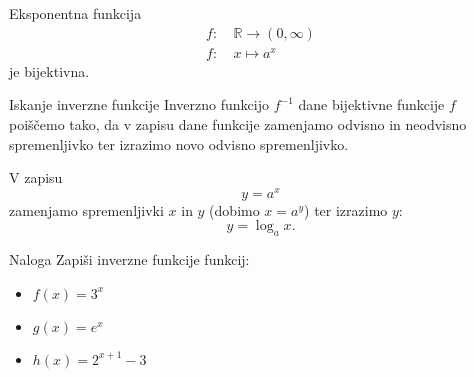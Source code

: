         \begin{frame}[t]

            Eksponentna funkcija
            \begin{align*}
                f:\ &\mathbb{R} \to (0,\infty)\\
                f:\  &x \mapsto a^x
            \end{align*}
            je bijektivna. 
            
            \begin{block}{Iskanje inverzne funkcije}
                Inverzno funkcijo $f^{-1}$ dane bijektivne funkcije $f$ poiščemo tako, da v zapisu dane funkcije zamenjamo odvisno in neodvisno spremenljivko ter izrazimo novo odvisno spremenljivko.
            \end{block}
            
            V zapisu $$y=a^x$$ zamenjamo spremenljivki $x$ in $y$ (dobimo $x=a^y$) ter izrazimo $y$: $$y=\log_ax.$$

        \end{frame}

        \begin{frame}[t]
            \begin{exampleblock}{Naloga}
                Zapiši inverzne funkcije funkcij:
                \begin{itemize}
                    \item $f(x)=3^x$
                    \item $g(x)=e^x$
                    \item $h(x)=2^{x+1}-3$
                \end{itemize}
            \end{exampleblock}
        \end{frame}

